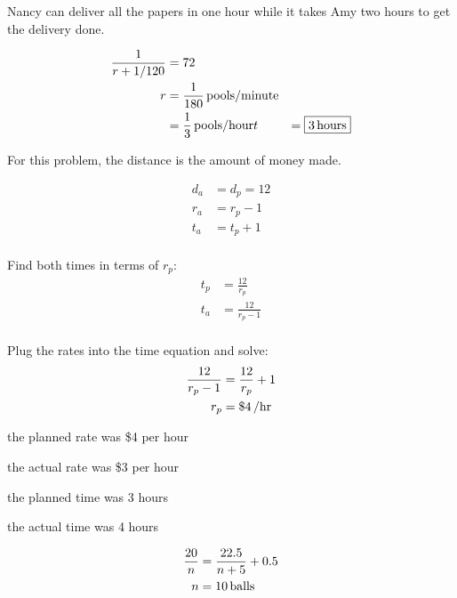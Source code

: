 \documentclass[letterpaper, landscape]{exam}
\begin{document}
\begin{description}
        Nancy can deliver all the papers in one hour while it takes Amy two hours to get the delivery done.

      \item[54]
        \begin{align*}
          \frac{1}{r + 1/120} & = 72 \\
          r                   & = \unit[\frac{1}{180}]{pools/minute} \\
                              & = \unit[\frac{1}{3}]{pools/hour}
          t                   & = \boxed{ \unit[3]{hours} } \\
        \end{align*}

      \item[55]
        For this problem, the distance is the amount of money made.

        \begin{align*}
          d_a & = d_p = 12 \\
          r_a & = r_p - 1 \\
          t_a & = t_p + 1 \\
        \end{align*}

        Find both times in terms of $r_p$:
        \begin{align*}
          t_p & = \frac{12}{r_p} \\
          t_a & = \frac{12}{r_p - 1} \\
        \end{align*}

        Plug the rates into the time equation and solve:
        \begin{align*}
          \frac{12}{r_p - 1} & = \frac{12}{r_p} + 1 \\
          r_p                & = \unit[\$4]{/hr} \\
        \end{align*}

        \begin{itemize*}
          \item the planned rate was \$4 per hour
          \item the actual rate was \$3 per hour
          \item the planned time was 3 hours
          \item the actual time was 4 hours
        \end{itemize*}

      \item[56]
        \begin{align*}
          \frac{20}{n} & = \frac{22.5}{n + 5} + 0.5 \\
          n            & = \unit[10]{balls} \\
        \end{align*}


\end{description}
\end{document}
